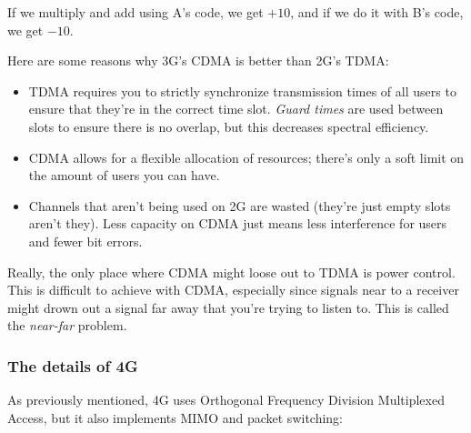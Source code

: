 If we multiply and add using A's code, we get $+10$, and if we do it with
B's code, we get $-10$.

Here are some reasons why 3G's CDMA is better than 2G's TDMA:

\begin{mymulticols}
  \begin{itemize}
    \item TDMA requires you to strictly synchronize transmission times of all
      users to ensure that they're in the correct time slot. \textit{Guard
      times} are used between slots to ensure there is no overlap, but this 
      decreases spectral efficiency.
    \item CDMA allows for a flexible allocation of resources; there's only a
      soft limit on the amount of users you can have.
    \item Channels that aren't being used on 2G are wasted (they're just empty
      slots aren't they). Less capacity on CDMA just means less interference for
      users and fewer bit errors.
  \end{itemize}
\end{mymulticols}

Really, the only place where CDMA might loose out to TDMA is power control. This
is difficult to achieve with CDMA, especially since signals near to a receiver
might drown out a signal far away that you're trying to listen to. This is
called the \textit{near-far} problem.

\subsubsection{The details of 4G}

As previously mentioned, 4G uses Orthogonal Frequency Division Multiplexed
Access, but it also implements MIMO and packet switching:

